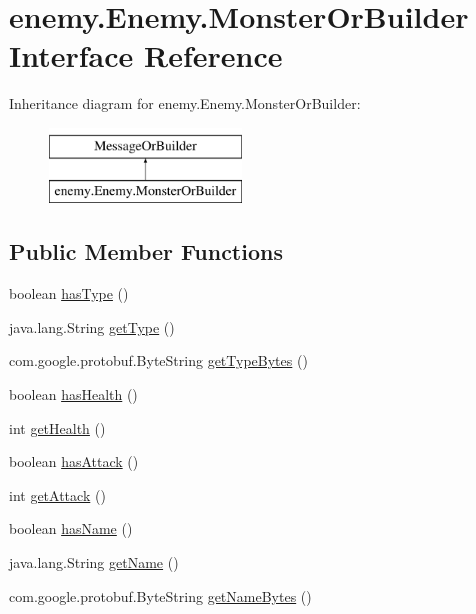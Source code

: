 \hypertarget{interfaceenemy_1_1_enemy_1_1_monster_or_builder}{}\section{enemy.\+Enemy.\+Monster\+Or\+Builder Interface Reference}
\label{interfaceenemy_1_1_enemy_1_1_monster_or_builder}
Inheritance diagram for enemy.\+Enemy.\+Monster\+Or\+Builder\+:\begin{figure}[H]
\begin{center}
\leavevmode
\includegraphics[height=2.000000cm]{interfaceenemy_1_1_enemy_1_1_monster_or_builder}
\end{center}
\end{figure}
\subsection*{Public Member Functions}
\begin{DoxyCompactItemize}
\item 
boolean \hyperlink{interfaceenemy_1_1_enemy_1_1_monster_or_builder_a6b176c6b78d427de79efd20f927a62c8}{has\+Type} ()
\item 
java.\+lang.\+String \hyperlink{interfaceenemy_1_1_enemy_1_1_monster_or_builder_a841aa6c26c499577d603915fd1ac8b41}{get\+Type} ()
\item 
com.\+google.\+protobuf.\+Byte\+String \hyperlink{interfaceenemy_1_1_enemy_1_1_monster_or_builder_adebc3b52131dcbc776b2319af774d1ec}{get\+Type\+Bytes} ()
\item 
boolean \hyperlink{interfaceenemy_1_1_enemy_1_1_monster_or_builder_aab69d054af2dab8ac2ce9f72c4adeaee}{has\+Health} ()
\item 
int \hyperlink{interfaceenemy_1_1_enemy_1_1_monster_or_builder_a8d716340ab45c1c19416e76eb97ea1a6}{get\+Health} ()
\item 
boolean \hyperlink{interfaceenemy_1_1_enemy_1_1_monster_or_builder_a58b07ebaacd518371114e646f2629b68}{has\+Attack} ()
\item 
int \hyperlink{interfaceenemy_1_1_enemy_1_1_monster_or_builder_aa88fa088b2a4a68640345817ed24d54d}{get\+Attack} ()
\item 
boolean \hyperlink{interfaceenemy_1_1_enemy_1_1_monster_or_builder_ab41eec40941a2626b07b61f4ecfdecb3}{has\+Name} ()
\item 
java.\+lang.\+String \hyperlink{interfaceenemy_1_1_enemy_1_1_monster_or_builder_a71db3323eccff3b3dd2788d54178e821}{get\+Name} ()
\item 
com.\+google.\+protobuf.\+Byte\+String \hyperlink{interfaceenemy_1_1_enemy_1_1_monster_or_builder_aae916496b512a0ad203692250dd1ec91}{get\+Name\+Bytes} ()
\end{DoxyCompactItemize}


